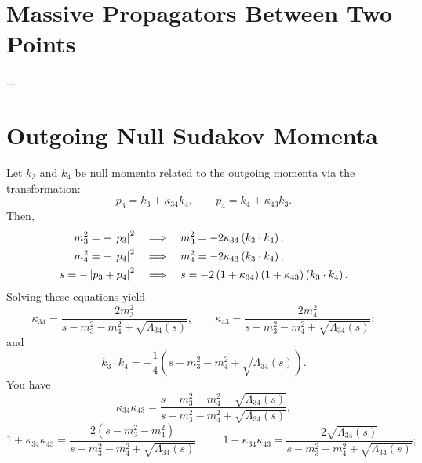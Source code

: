 \section{Massive Propagators Between Two Points}
...
\section{Outgoing Null Sudakov Momenta}
Let $k_{3}$ and $k_{4}$ be null momenta related to the outgoing momenta via the transformation:
\begin{equation}
	p_{3} = k_{3} + \kappa_{34} k_{4}, \qquad p_{4} = k_{4} + \kappa_{43} k_{3}.
	\label{eq:sudakov_3_4}
\end{equation}
Then,
\begin{align}
	m_{3}^{2} = - \left\lvert p_{3} \right\rvert^{2} \quad &\Longrightarrow \quad m_{3}^{2} = - 2 \kappa_{34} \left( k_{3} \cdot k_{4} \right), \\
	m_{4}^{2} = - \left\lvert p_{4} \right\rvert^{2} \quad &\Longrightarrow \quad m_{4}^{2} = - 2 \kappa_{43} \left( k_{3} \cdot k_{4} \right), \\
	s = - \left\lvert p_{3} + p_{4} \right\rvert^{2} \quad &\Longrightarrow \quad s = - 2 \left(1 + \kappa_{34} \right) \left(1 + \kappa_{43} \right) \left( k_{3} \cdot k_{4} \right).
\end{align}
Solving these equations yield
\begin{equation}
	\kappa_{34} = \frac{2 m_{3}^{2}}{s - m_{3}^{2} - m_{4}^{2} + \sqrt{\Lambda_{34}(s)}}, \qquad \kappa_{43} = \frac{2 m_{4}^{2}}{s - m_{3}^{2} - m_{4}^{2} + \sqrt{\Lambda_{34}(s)}};
\end{equation}
and
\begin{equation}
	k_{3} \cdot k_{4} = -\frac{1}{4} \left( s - m_{3}^{2} - m_{4}^{2} + \sqrt{\Lambda_{34}(s)} \right).
\end{equation}
You have
\begin{equation}
	\kappa_{34} \kappa_{43} = \frac{s - m_{3}^{2} - m_{4}^{2} - \sqrt{\Lambda_{34}(s)}}{s - m_{3}^{2} - m_{4}^{2} + \sqrt{\Lambda_{34}(s)}},
\end{equation}
\begin{equation}
	1 + \kappa_{34} \kappa_{43} = \frac{ 2 \left( s - m_{3}^{2} - m_{4}^{2} \right)}{s - m_{3}^{2} - m_{4}^{2} + \sqrt{\Lambda_{34}(s)}}, \qquad
	1 - \kappa_{34} \kappa_{43} = \frac{ 2 \sqrt{\Lambda_{34}(s)}}{s - m_{3}^{2} - m_{4}^{2} + \sqrt{\Lambda_{34}(s)}};
\end{equation}
